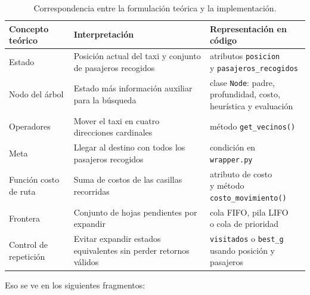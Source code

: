 \documentclass[12pt,a4paper]{article}
\begin{document}
\begin{table}[H]
    \centering
    \footnotesize
    \setlength{\tabcolsep}{4pt}
    \renewcommand{\arraystretch}{1.08}
    \begin{tabularx}{\textwidth}{|>{\raggedright\arraybackslash}p{2.9cm}|>{\raggedright\arraybackslash}X|>{\raggedright\arraybackslash}p{4.8cm}|}
        \hline
        \textbf{Concepto teórico} & \textbf{Interpretación} & \textbf{Representación en código} \\
        \hline
        Estado & Posición actual del taxi y conjunto de pasajeros recogidos & \shortstack[l]{atributos \nolinkurl{posicion}\\ y \nolinkurl{pasajeros_recogidos}} \\
        \hline
        Nodo del árbol & Estado más información auxiliar para la búsqueda & \shortstack[l]{clase \nolinkurl{Node}: padre,\\ profundidad, costo,\\ heurística y evaluación} \\
        \hline
        Operadores & Mover el taxi en cuatro direcciones cardinales & método \nolinkurl{get_vecinos()} \\
        \hline
        Meta & Llegar al destino con todos los pasajeros recogidos & \shortstack[l]{condición en\\ \nolinkurl{wrapper.py}} \\
        \hline
        Función costo de ruta & Suma de costos de las casillas recorridas & \shortstack[l]{atributo de costo\\ y método\\ \nolinkurl{costo_movimiento()}} \\
        \hline
        Frontera & Conjunto de hojas pendientes por expandir & \shortstack[l]{cola FIFO, pila LIFO\\ o cola de prioridad} \\
        \hline
        Control de repetición & Evitar expandir estados equivalentes sin perder retornos válidos & \shortstack[l]{\nolinkurl{visitados} o \nolinkurl{best_g}\\ usando posición y pasajeros} \\
        \hline
    \end{tabularx}
    \caption{Correspondencia entre la formulación teórica y la implementación.}
    \label{tab:teoria-implementacion}
\end{table}

Eso se ve en los siguientes fragmentos:
\end{document}
